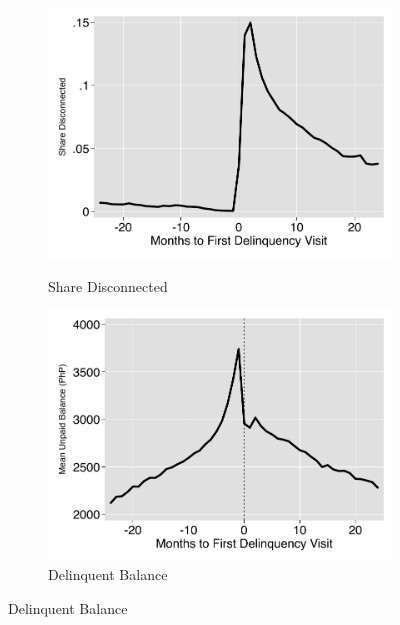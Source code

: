 \documentclass[12pt]{article}
\begin{document}
\begin{figure}[hbtp]
    \centering
    \vspace{2mm}
    \begin{subfigure}[b]{0.49\textwidth}
        \centering
        \caption[]{\small Share Disconnected}  
        \vspace{-1mm}
        \includegraphics[width=\textwidth,trim={.2cm .2cm .2cm 0cm}, clip=true]{tables/line1_disconnection}
        \label{fig:line_disc}
    \end{subfigure}
    \hfill
    \begin{subfigure}[b]{0.49\textwidth}  
        \centering 
        \caption[]{\small Delinquent Balance}
        \vspace{-1mm}
        \includegraphics[width=\textwidth,trim={.2cm .2cm .2cm 0cm}, clip=true]{tables/line1_bal}

\end{subfigure}
\end{figure}
\end{document}
